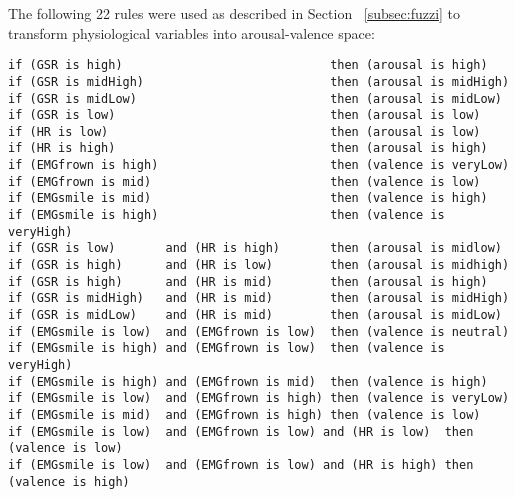
The following 22 rules were used as described in Section ~\ref{subsec:fuzzi} to transform physiological variables into arousal-valence space:

%

\begin{lstlisting}[frame=none]
if (GSR is high)                             then (arousal is high)
if (GSR is midHigh)                          then (arousal is midHigh)
if (GSR is midLow)                           then (arousal is midLow)
if (GSR is low)                              then (arousal is low)
if (HR is low)                               then (arousal is low)
if (HR is high)                              then (arousal is high)
if (EMGfrown is high)                        then (valence is veryLow)
if (EMGfrown is mid)                         then (valence is low)
if (EMGsmile is mid)                         then (valence is high)
if (EMGsmile is high)                        then (valence is veryHigh)
if (GSR is low)       and (HR is high)       then (arousal is midlow)
if (GSR is high)      and (HR is low)        then (arousal is midhigh)
if (GSR is high)      and (HR is mid)        then (arousal is high)
if (GSR is midHigh)   and (HR is mid)        then (arousal is midHigh)
if (GSR is midLow)    and (HR is mid)        then (arousal is midLow)
if (EMGsmile is low)  and (EMGfrown is low)  then (valence is neutral)
if (EMGsmile is high) and (EMGfrown is low)  then (valence is veryHigh)
if (EMGsmile is high) and (EMGfrown is mid)  then (valence is high)
if (EMGsmile is low)  and (EMGfrown is high) then (valence is veryLow)
if (EMGsmile is mid)  and (EMGfrown is high) then (valence is low)
if (EMGsmile is low)  and (EMGfrown is low) and (HR is low)  then (valence is low)
if (EMGsmile is low)  and (EMGfrown is low) and (HR is high) then (valence is high)
\end{lstlisting}
